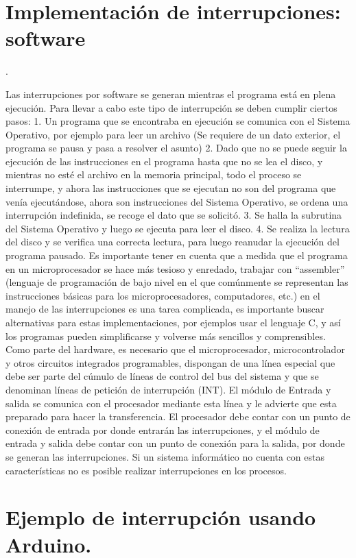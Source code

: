 \documentclass{article}
\begin{document}
\section{Implementación de interrupciones: software}.\cite{ArquictComp}

Las interrupciones por software se generan mientras el programa está en plena ejecución. Para llevar a cabo este tipo de interrupción se deben cumplir ciertos pasos:
1. Un programa que se encontraba en ejecución se comunica con el Sistema Operativo, por ejemplo para leer un archivo (Se requiere de un dato exterior, el programa se pausa y pasa a resolver el asunto)
2. Dado que no se puede seguir la ejecución de las instrucciones en el programa hasta que no se lea el disco, y mientras no esté el archivo en la memoria principal, todo el proceso se interrumpe, y ahora las instrucciones que se ejecutan no son del programa que venía ejecutándose, ahora son instrucciones del Sistema Operativo, se ordena una interrupción indefinida, se recoge el dato que se solicitó.
3. Se halla la subrutina del Sistema Operativo y luego se ejecuta para leer el disco.
4. Se realiza la lectura del disco y se verifica una correcta lectura, para luego reanudar la ejecución del programa pausado.
Es importante tener en cuenta que a medida que el programa en un microprocesador se hace más tesioso y enredado, trabajar con “assembler” (lenguaje de programación de bajo nivel en el que comúnmente se representan las instrucciones básicas para los microprocesadores, computadores, etc.) en el manejo de  las interrupciones es una tarea complicada, es importante buscar alternativas para estas implementaciones, por ejemplos usar el lenguaje C, y así los programas pueden simplificarse y volverse más sencillos y comprensibles.
Como parte del hardware, es necesario que el microprocesador, microcontrolador y otros circuitos integrados programables, dispongan de una línea especial que debe ser parte del cúmulo de líneas de control del bus del sistema y que se denominan líneas de petición de interrupción (INT). El módulo de Entrada y salida se comunica con el procesador mediante esta línea y le advierte que esta preparado para hacer la transferencia. El procesador debe contar con un punto de conexión de entrada por donde entrarán las interrupciones, y el módulo de entrada y salida debe contar con un punto de conexión para la salida, por donde se generan las interrupciones. Si un sistema informático no cuenta con estas características no es posible realizar interrupciones en los procesos.

\section{Ejemplo de interrupción usando Arduino.} \cite{arduino}
\end{document}
